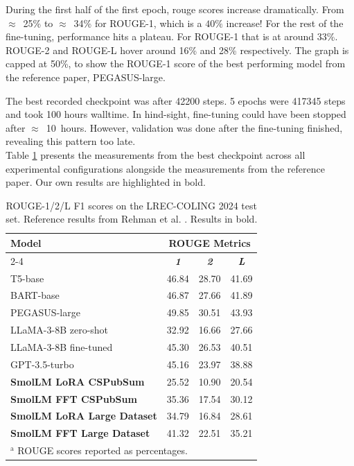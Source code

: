 \documentclass[12pt,conference]{IEEEtran}
\begin{document}
During the first half of the first epoch, rouge scores increase dramatically. From $\approx$~25\% to $\approx$~34\% for ROUGE-1, which is a $40\%$ increase! 
For the rest of the fine-tuning, performance hits a plateau. For ROUGE-1 that is at around 33\%. ROUGE-2 and ROUGE-L hover around 16\% and 28\% respectively. The graph is capped at 50\%, to show the ROUGE-1 score of the best performing model from the reference paper, PEGASUS-large.

The best recorded checkpoint was after 42200 steps. 5 epochs were 417345 steps and took 100 hours walltime. In hind-sight, fine-tuning could have been stopped after $\approx$~10~hours. However, validation was done after the fine-tuning finished, revealing this pattern too late. \\

Table \ref{tab:rouge_comparison} presents the measurements from the best checkpoint across all experimental configurations alongside the measurements from the reference paper. Our own results are highlighted in bold.

\begin{table}[htbp]
\caption{ROUGE-1/2/L F1 scores on the LREC-COLING 2024 test set. Reference results from Rehman  et al. \cite{b2}. Results in bold.}
\begin{center}
\begin{tabular}{|l|c|c|c|}
\hline
\textbf{Model} & \multicolumn{3}{|c|}{\textbf{ROUGE Metrics}} \\
\cline{2-4}
 & \textbf{\textit{1}} & \textbf{\textit{2}} & \textbf{\textit{L}} \\
\hline
T5-base                      & 46.84 & 28.70 & 41.69 \\
BART-base                    & 46.87 & 27.66 & 41.89 \\
PEGASUS-large                & 49.85 & 30.51 & 43.93 \\
LLaMA-3-8B zero-shot         & 32.92 & 16.66 & 27.66 \\
LLaMA-3-8B fine-tuned        & 45.30 & 26.53 & 40.51 \\
GPT-3.5-turbo                & 45.16 & 23.97 & 38.88 \\
\hline
\textbf{SmolLM LoRA CSPubSum}    & 25.52 & 10.90 & 20.54 \\
\textbf{SmolLM FFT CSPubSum}     & 35.36 & 17.54 & 30.12 \\
\textbf{SmolLM LoRA Large Dataset} & 34.79 & 16.84 & 28.61 \\
\textbf{SmolLM FFT Large Dataset}  & 41.32 & 22.51 & 35.21 \\
\hline
\multicolumn{4}{l}{$^{\mathrm{a}}$ ROUGE scores reported as percentages.}
\end{tabular}
\label{tab:rouge_comparison}
\end{center}
\end{table}
\end{document}
